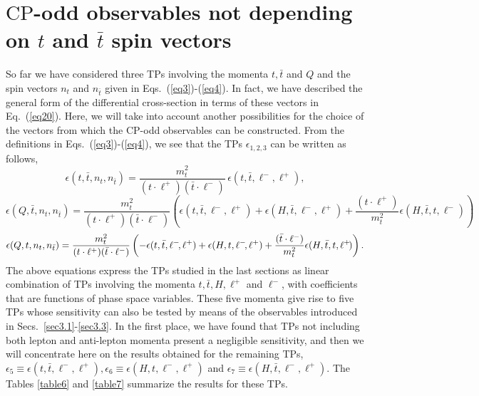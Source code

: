 \documentclass[aps,preprint,tightenlines,floatfix,superscriptaddress,nofootinbib,showpacs]{revtex4-1}
\def\beq{\begin{equation}}
\def\eeq{\end{equation}}
\def\tbar{\bar{t}}
\def\TPa{\epsilon(t,\tbar,n_t,n_{\tbar})}
\def\TPb{\epsilon(Q,\tbar,n_t,n_{\tbar})}
\def\TPc{\epsilon(Q,t,n_t,n_{\tbar})}
\begin{document}
\section{{\boldmath $\mathrm{CP}$}-odd observables not depending on \MakeLowercase{{\boldmath $t$}} and \MakeLowercase{{\boldmath $\tbar$}} spin vectors}
\label{sec4}
So far we have considered three TPs involving the momenta $t,\tbar$
and $Q$ and the spin vectors $n_t$ and $n_{\tbar}$ given in
Eqs.~(\ref{eq3})-(\ref{eq4}). In fact, we have described the general
form of the differential cross-section in terms of these vectors in
Eq.~(\ref{eq20}). Here, we will take into account another
possibilities for the choice of the vectors from which the
$\mathrm{CP}$-odd observables can be constructed. From the definitions
in Eqs.~(\ref{eq3})-(\ref{eq4}), we see that the TPs
$\epsilon_{1,2,3}$ can be written as follows,
%
\beq
\label{eq29}
\TPa = \frac{m^2_t}{(t\cdot \ell^+)(\tbar\cdot \ell^-)}\,\epsilon(t,\tbar,\ell^-\!,\ell^+),
\eeq
%
\vspace*{1mm}
\beq
\label{eq30}
\TPb = \frac{m^2_t}{(t\cdot \ell^+)(\tbar\cdot \ell^-)}\left(\epsilon(t,\tbar,\ell^-\!,\ell^+)+\epsilon(H,\tbar,\ell^-\!,\ell^+)+\frac{(t\cdot\ell^+)}{m^2_t}\epsilon(H,\tbar,t,\ell^-\!)\right)
\eeq
%
\vspace*{1mm}
\beq
\label{eq31}
\TPc = \frac{m^2_t}{(t\cdot \ell^+)(\tbar\cdot \ell^-)}\left(-\epsilon(t,\tbar,\ell^-\!,\ell^+)+\epsilon(H,t,\ell^-\!,\ell^+)+\frac{(\tbar\cdot\ell^-)}{m^2_t}\epsilon(H,\tbar,t,\ell^+\!)\right).
\vspace*{2mm}
\eeq
%
The above equations express the TPs studied in the last sections as
linear combination of TPs involving the momenta $t,\tbar,H,\ell^+$ and
$\ell^-$, with coefficients that are functions of phase space
variables. These five momenta give rise to five TPs whose sensitivity
can also be tested by means of the observables introduced in
Secs.~\ref{sec3.1}-\ref{sec3.3}. In the first place, we have found
that TPs not including both lepton and anti-lepton momenta present a
negligible sensitivity, and then we will concentrate here on the
results obtained for the remaining TPs,
$\epsilon_5\equiv\epsilon(t,\tbar,\ell^-\!,\ell^+),
\epsilon_6\equiv\epsilon(H,t,\ell^-\!,\ell^+)$ and $\epsilon_7\equiv
\epsilon(H,\tbar,\ell^-\!,\ell^+)$. The Tables \ref{table6} and
\ref{table7} summarize the results for these TPs.
\renewcommand{\arraystretch}{1.6}
\end{document}
